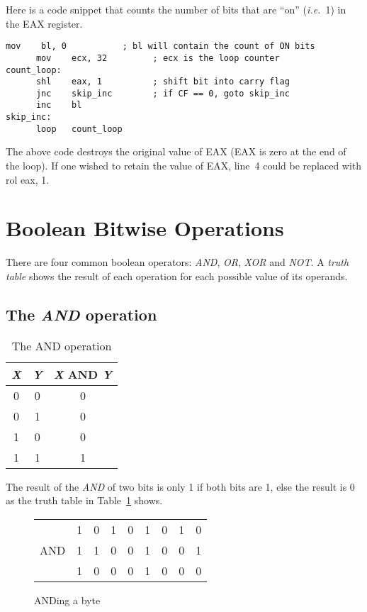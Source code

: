 Here is a code snippet that counts the number of bits that are ``on''
(\emph{i.e.}~1) in the EAX register.
\begin{lstlisting}[language={[x86masm]Assembler}]
      mov    bl, 0           ; bl will contain the count of ON bits
      mov    ecx, 32         ; ecx is the loop counter
count_loop:
      shl    eax, 1          ; shift bit into carry flag
      jnc    skip_inc        ; if CF == 0, goto skip_inc
      inc    bl
skip_inc:
      loop   count_loop
\end{lstlisting}
The above code destroys the original value of {\code EAX} ({\code EAX} is zero
at the end of the loop). If one wished to retain the value of {\code EAX},
line~4 could be replaced with {\code rol  eax, 1}.

\section{Boolean Bitwise Operations}

There are four common boolean operators: \emph{AND}, \emph{OR}, \emph{XOR} and
\emph{NOT}. A \emph{truth table} shows the result of each operation for each
possible value of its operands.

\subsection{The \emph{AND} operation}

\begin{table}[t]
\centering
\begin{tabular}{|c|c|c|}
\hline
\emph{X} & \emph{Y} & \emph{X} AND \emph{Y} \\
\hline \hline
0 & 0 & 0 \\
0 & 1 & 0 \\
1 & 0 & 0 \\
1 & 1 & 1 \\
\hline
\end{tabular}
\caption{The AND operation \label{tab:and} }
\end{table}

The result of the \emph{AND} of two bits is only 1 if both bits are 1, else
the result is 0 as the truth table in Table~\ref{tab:and} shows.

\begin{figure}[t]
\centering
\begin{tabular}{rcccccccc}
    & 1 & 0 & 1 & 0 & 1 & 0 & 1 & 0 \\
AND & 1 & 1 & 0 & 0 & 1 & 0 & 0 & 1 \\
\hline
    & 1 & 0 & 0 & 0 & 1 & 0 & 0 & 0
\end{tabular}
\caption{ANDing a byte \label{fig:and}}
\end{figure}

